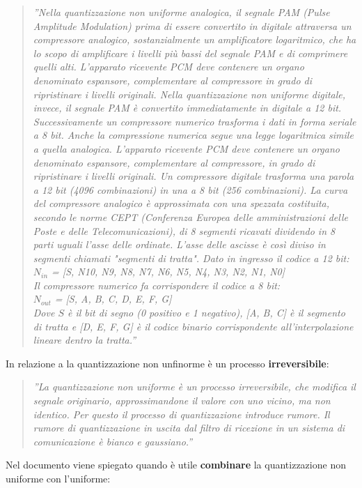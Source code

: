 \documentclass[a4paper]{report} %
\begin{document}
\begin{quote}	
	\textit{''Nella quantizzazione non uniforme analogica, il segnale PAM (Pulse Amplitude Modulation) prima di essere convertito in digitale attraversa un compressore analogico, sostanzialmente un amplificatore logaritmico, che ha lo scopo di amplificare i livelli più bassi del segnale PAM e di comprimere quelli alti. L'apparato ricevente PCM deve contenere un organo denominato espansore, complementare al compressore in grado di ripristinare i livelli originali. Nella quantizzazione non uniforme digitale, invece, il segnale PAM è convertito immediatamente in digitale a 12 bit. Successivamente un compressore numerico trasforma i dati in forma seriale a 8 bit. Anche la compressione numerica segue una legge logaritmica simile a quella analogica. L'apparato ricevente PCM deve contenere un organo denominato espansore, complementare al compressore, in grado di ripristinare i livelli originali. Un compressore digitale trasforma una parola a 12 bit (4096 combinazioni) in una a 8 bit (256 combinazioni). La curva del compressore analogico è approssimata con una spezzata costituita, secondo le norme CEPT (Conferenza Europea delle amministrazioni delle Poste e delle Telecomunicazioni), di 8 segmenti ricavati dividendo in 8 parti uguali l'asse delle ordinate. L'asse delle ascisse è così diviso in segmenti chiamati "segmenti di tratta". Dato in ingresso il codice a 12 bit: \\
	$N_{in}$ = [S, N10, N9, N8, N7, N6, N5, N4, N3, N2, N1, N0] \\
	Il compressore numerico fa corrispondere il codice a 8 bit: \\
	$N_{out}$ = [S, A, B, C, D, E, F, G] \\
	Dove $S$ è il bit di segno (0 positivo e 1 negativo), [A, B, C] è il segmento di tratta e [D, E, F, G] è il codice binario corrispondente all'interpolazione lineare dentro la tratta.''} 
\end{quote}
In relazione a \cite{art:rif.6} la quantizzazione non unfinorme è un processo \textbf{irreversibile}:
\begin{quote}
	\textit{''La quantizzazione non uniforme è un processo irreversibile, che modifica il segnale originario, approssimandone il valore con uno vicino, ma non identico. Per questo il processo di quantizzazione introduce rumore. Il rumore di quantizzazione in uscita dal filtro di ricezione in un sistema di comunicazione è bianco e gaussiano.''} 
\end{quote}
Nel documento \cite{art:rif.7} viene spiegato quando è utile \textbf{combinare} la quantizzazione non uniforme con l'uniforme:
\end{document}

